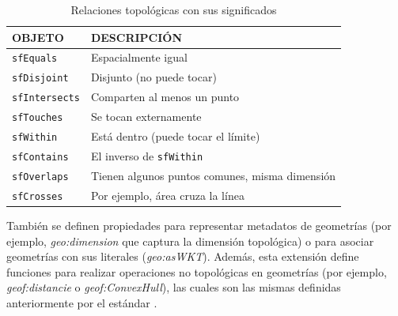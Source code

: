 \begin{table}[H]
	\caption{Relaciones topológicas con sus significados}
	\label{topo-geosparql}
	\centering
	\begin{tabular}{|l|l|}
		\hline
		\rowcolor[HTML]{EFEFEF} 
		{\textbf{OBJETO}} & { \textbf{DESCRIPCIÓN}} \\ \hline
		\texttt{sfEquals}	&              Espacialmente igual           \\ \hline
		\texttt{sfDisjoint}	&        Disjunto (no puede tocar)                 \\ \hline
		\texttt{sfIntersects}	&     Comparten al menos un punto                    \\ \hline
		\texttt{sfTouches} &          Se tocan externamente               \\ \hline
		\texttt{sfWithin}	&      Está dentro (puede tocar el límite)                   \\ \hline
		\texttt{sfContains} &             El inverso de \texttt{sfWithin}            \\ \hline
		\texttt{sfOverlaps}	&            Tienen algunos puntos comunes, misma dimensión             \\ \hline
		\texttt{sfCrosses} &         Por ejemplo, área cruza la línea                \\ \hline		
	\end{tabular}
\end{table}


También se definen propiedades para representar metadatos de geometrías (por ejemplo, \textit{geo:dimension} que captura la dimensión topológica) o para asociar geometrías con sus literales (\textit{geo:asWKT}). Además, esta extensión define funciones para realizar operaciones no topológicas en geometrías (por ejemplo, \textit{geof:distancie} o \textit{geof:ConvexHull}), las cuales son las mismas definidas anteriormente por el estándar \cite{wkt-database}.



